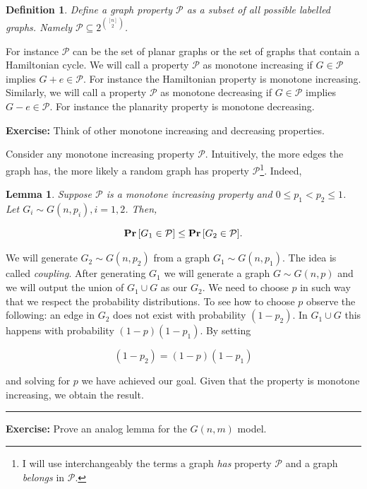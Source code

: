 \documentclass[twoside]{article}
\newtheorem{lemma}[theorem]{Lemma}
\newtheorem{definition}[theorem]{Definition}
\newenvironment{proof}{{\bf Proof:}}{\hfill\rule{2mm}{2mm}}
\newcommand{\Prob}[1]{{{\bf{Pr}}\left[{#1}\right]}}
\begin{document}
\begin{definition}
Define a graph property $\mathcal{P}$ as a subset of all possible labelled graphs. 
Namely $\mathcal{P} \subseteq 2^{[n] \choose 2}$. 
\end{definition} 

For instance $\mathcal{P}$ can be the set of planar graphs or the set of graphs
that contain a Hamiltonian cycle. 
We will call a property $\mathcal{P}$ as monotone increasing if $G \in \mathcal{P}$ 
implies $G+e \in \mathcal{P}$. For instance the Hamiltonian property is monotone 
increasing. 
Similarly, we will call a property $\mathcal{P}$ as monotone decreasing if $G \in \mathcal{P}$ 
implies $G-e \in \mathcal{P}$.
For instance the planarity property is monotone decreasing. 


{\bf Exercise:} Think of other monotone increasing and decreasing properties. 

Consider any monotone increasing property $\mathcal{P}$. Intuitively, the more edges the graph
has, the more likely a random graph has property $\mathcal{P}$\footnote{I will 
use interchangeably the terms a graph {\it has} property $\mathcal{P}$ and a graph 
{\it belongs} in $\mathcal{P}$. }. Indeed, 

\begin{lemma}
\label{lem:lec1lem1}
Suppose $\mathcal{P}$ is a monotone increasing property and $0 \leq p_1 < p_2 \leq 1$. 
Let $G_i \sim G(n,p_i), i=1,2$. Then, 

$$ \Prob{ G_1 \in \mathcal{P} } \leq  \Prob{ G_2 \in \mathcal{P} }.$$
\end{lemma}

\begin{proof}
We will generate $G_2 \sim G(n,p_2)$ from a graph $G_1 \sim G(n,p_1)$.
The idea is called {\it coupling}. After generating $G_1$ we will 
generate a graph $G \sim G(n,p)$ and we will output the union of $G_1 \cup G$
as our $G_2$. We need to choose $p$ in such way that we respect the probability
distributions. To see how to choose $p$ observe the following: 
an edge in $G_2$ does not exist with probability $(1-p_2)$. 
In $G_1 \cup G$ this happens with probability $(1-p)(1-p_1)$. 
By setting 

$$ (1-p_2)=(1-p)(1-p_1)$$ 

\noindent and solving for $p$ we have achieved our goal. 
Given that the property is monotone increasing, we obtain the result. 
\end{proof} 

{\bf Exercise:} Prove an analog lemma for the $G(n,m)$ model. 
\end{document}
